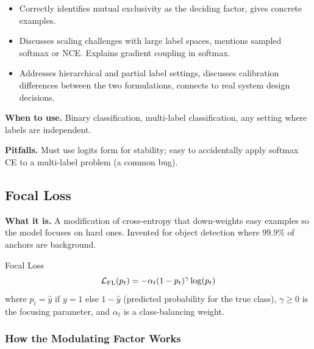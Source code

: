 \begin{interviewq}
\goodgreat
\begin{itemize}
    \item {} Correctly identifies mutual exclusivity as the deciding factor, gives concrete examples.
    \item {} Discusses scaling challenges with large label spaces, mentions sampled softmax or NCE. Explains gradient coupling in softmax.
    \item {} Addresses hierarchical and partial label settings, discusses calibration differences between the two formulations, connects to real system design decisions.
\end{itemize}

\end{interviewq}

\textbf{When to use.} Binary classification, multi-label classification, any setting where labels are independent.

\textbf{Pitfalls.} Must use logits form for stability; easy to accidentally apply softmax CE to a multi-label problem (a common bug).

\subsection{Focal Loss}

\textbf{What it is.} A modification of cross-entropy that down-weights easy examples so the model focuses on hard ones. Invented for object detection where 99.9\% of anchors are background.

\begin{mathresult}{Focal Loss}
\begin{equation}
\mathcal{L}_{\text{FL}}(p_t) = -\alpha_t (1 - p_t)^\gamma \log(p_t)
\end{equation}
where $p_t = \hat{y}$ if $y=1$ else $1-\hat{y}$ (predicted probability for the true class), $\gamma \geq 0$ is the focusing parameter, and $\alpha_t$ is a class-balancing weight.
\end{mathresult}

\subsubsection{How the Modulating Factor Works}

